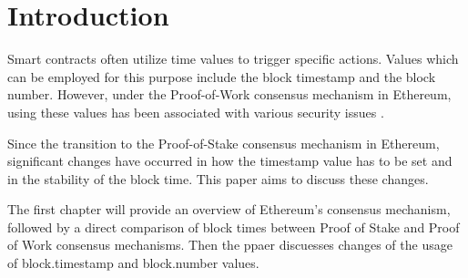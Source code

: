 \section{Introduction}

Smart contracts often utilize time values to trigger specific actions. Values
which can be employed for this purpose include the block timestamp and
the block number. However, under the Proof-of-Work consensus mechanism in
Ethereum, using these values has been associated with various security issues
\cite{swc116} \cite{Conkas2021} \cite{DASP2018} \cite{Osiris2018}
\cite{Oyente2016}.

Since the transition to the Proof-of-Stake consensus mechanism in
Ethereum, significant changes have occurred in how the timestamp value has to
be set and in the stability of the block time. This paper aims to discuss these
changes. 

The first chapter will provide an overview of Ethereum's consensus mechanism,
followed by a direct comparison of block times between Proof of Stake and
Proof of Work consensus mechanisms. Then the ppaer discuesses changes of the
usage of block.timestamp and block.number values.

